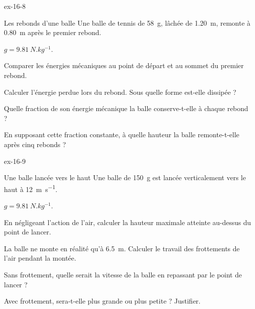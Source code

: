 \begin{blocLivre}{ex-16-8}
\begin{exercice}[2]{Les rebonds d'une balle}
Une balle de tennis de \qty{58}{g}, lâchée de \qty{1,20}{m}, remonte à \qty{0,80}{m} après le premier rebond.
\begin{donnees}
$g=\qty{9,81}{N.kg^{-1}}$.
\end{donnees}
\begin{questions}
\item Comparer les énergies mécaniques au point de départ et au sommet du premier rebond.
\item Calculer l'énergie perdue lors du rebond. Sous quelle forme est-elle dissipée ?
\item Quelle fraction de son énergie mécanique la balle conserve-t-elle à chaque rebond ?
\item En supposant cette fraction constante, à quelle hauteur la balle remonte-t-elle après cinq rebonds ?
\end{questions}
\end{exercice}
\end{blocLivre}
\begin{blocLivre}{ex-16-9}
\begin{exercice}[2]{Une balle lancée vers le haut}
Une balle de \qty{150}{g} est lancée verticalement vers le haut à \qty{12}{m.s^{-1}}.
\begin{donnees}
$g=\qty{9,81}{N.kg^{-1}}$.
\end{donnees}
\begin{questions}
\item En négligeant l'action de l'air, calculer la hauteur maximale atteinte au-dessus du point de lancer.
\item La balle ne monte en réalité qu'à \qty{6,5}{m}. Calculer le travail des frottements de l'air pendant la montée.
\item Sans frottement, quelle serait la vitesse de la balle en repassant par le point de lancer ?
\item Avec frottement, sera-t-elle plus grande ou plus petite ? Justifier.
\end{questions}
\end{exercice}
\end{blocLivre}
